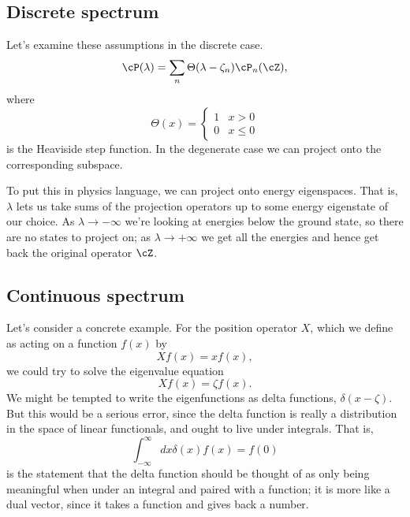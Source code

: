 \subsection*{Discrete spectrum}
Let's examine these assumptions in the discrete case.
\begin{equation}
    \cP(\lambda)= \sum_n \Theta(\lambda -\zeta_n) \cP_n (\cZ),
\end{equation}
where
\begin{equation}
    \Theta(x) = \begin{cases}
        1 & x>0\\
        0 & x\leq 0
    \end{cases}
\end{equation}
is the Heaviside step function. In the degenerate case we can project onto the corresponding subspace.

To put this in physics language, we can project onto energy eigenspaces. That is, $\lambda$ lets us take sums of the projection operators up to some energy eigenstate of our choice. As $\lambda\to -\infty$ we're looking at energies below the ground state, so there are no states to project on; as $\lambda \to + \infty$ we get all the energies and hence get back the original operator $\cZ$.

\subsection*{Continuous spectrum}
Let's consider a concrete example. For the position operator $X$, which we define as acting on a function $f(x)$ by
\begin{equation}
    Xf(x)=xf(x),
\end{equation}
we could try to solve the eigenvalue equation
\begin{equation}
    Xf(x) = \zeta f(x).
\end{equation}
We might be tempted to write the eigenfunctions as delta functions, $\delta(x-\zeta)$. But this would be a serious error, since the delta function is really a distribution in the space of linear functionals, and ought to live under integrals. That is,
\begin{equation}
    \int_{-\infty}^\infty dx \delta(x) f(x) =f(0)
\end{equation}
is the statement that the delta function should be thought of as only being meaningful when under an integral and paired with a function; it is more like a dual vector, since it takes a function and gives back a number.

